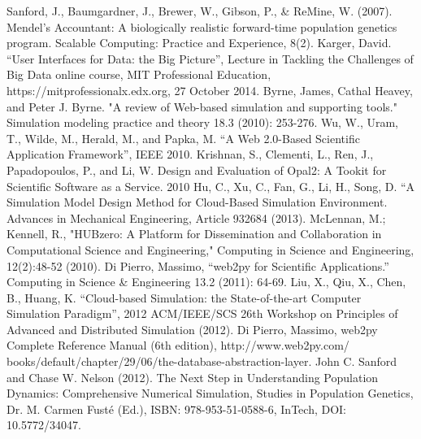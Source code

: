 \documentclass[10pt,reprint]{socc14}
\begin{document}
\begin{thebibliography}{}
\softraggedright

 Sanford, J., Baumgardner, J., Brewer, W., Gibson, P., \& ReMine, W. (2007). Mendel's Accountant: A biologically realistic forward-time population genetics program. Scalable Computing: Practice and Experience, 8(2).
 Karger, David. “User Interfaces for Data: the Big Picture”, Lecture in Tackling the Challenges of Big Data online course, MIT Professional Education, https://mitprofessionalx.edx.org, 27 October 2014.
 Byrne, James, Cathal Heavey, and Peter J. Byrne. "A review of Web-based simulation and supporting tools." Simulation modeling practice and theory 18.3 (2010): 253-276.
 Wu, W., Uram, T., Wilde, M., Herald, M., and Papka, M. “A Web 2.0-Based Scientific Application Framework”, IEEE 2010.
 Krishnan, S., Clementi, L., Ren, J., Papadopoulos, P., and Li, W.  Design and Evaluation of Opal2: A Tookit for Scientific Software as a Service. 2010
 Hu, C., Xu, C., Fan, G., Li, H., Song, D. “A Simulation Model Design Method for Cloud-Based Simulation Environment.  Advances in Mechanical Engineering, Article 932684 (2013).
 McLennan, M.; Kennell, R., "HUBzero: A Platform for Dissemination and Collaboration in Computational Science and Engineering," Computing in Science and Engineering, 12(2):48-52 (2010).
 Di Pierro, Massimo, “web2py for Scientific Applications.” Computing in Science \& Engineering 13.2 (2011): 64-69.
 Liu, X., Qiu, X., Chen, B., Huang, K. “Cloud-based Simulation: the State-of-the-art Computer Simulation Paradigm”, 2012 ACM/IEEE/SCS 26th Workshop on Principles of Advanced and Distributed Simulation (2012).
 Di Pierro, Massimo, web2py Complete Reference Manual (6th edition), http://www.web2py.com/ books/default/chapter/29/06/the-database-abstraction-layer.
 John C. Sanford and Chase W. Nelson (2012). The Next Step in Understanding Population Dynamics: Comprehensive Numerical Simulation, Studies in Population Genetics, Dr. M. Carmen  Fusté (Ed.), ISBN: 978-953-51-0588-6, InTech, DOI: 10.5772/34047.

\end{thebibliography}
\end{document}
